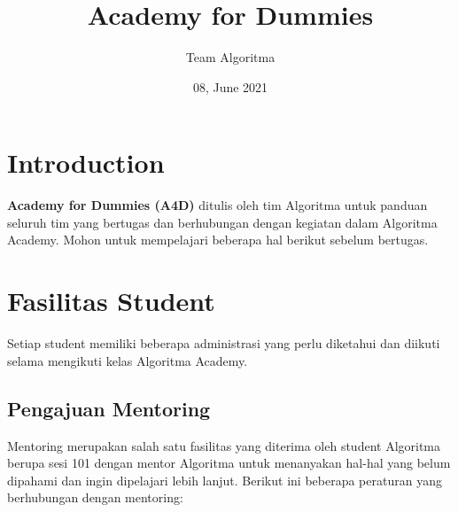 \documentclass[
]{book}
\title{Academy for Dummies}
\author{Team Algoritma}
\date{08, June 2021}
\begin{document}
\maketitle

{
\setcounter{tocdepth}{1}
\tableofcontents
}
\hypertarget{introduction}{%
\chapter{Introduction}\label{introduction}}

\textbf{Academy for Dummies (A4D)} ditulis oleh tim Algoritma untuk panduan seluruh tim yang bertugas dan berhubungan dengan kegiatan dalam Algoritma Academy. Mohon untuk mempelajari beberapa hal berikut sebelum bertugas.

\hypertarget{fasilitas-student}{%
\chapter{Fasilitas Student}\label{fasilitas-student}}

Setiap student memiliki beberapa administrasi yang perlu diketahui dan diikuti selama mengikuti kelas Algoritma Academy.

\hypertarget{pengajuan-mentoring}{%
\section{Pengajuan Mentoring}\label{pengajuan-mentoring}}

Mentoring merupakan salah satu fasilitas yang diterima oleh student Algoritma berupa sesi 101 dengan mentor Algoritma untuk menanyakan hal-hal yang belum dipahami dan ingin dipelajari lebih lanjut. Berikut ini beberapa peraturan yang berhubungan dengan mentoring:
\end{document}
